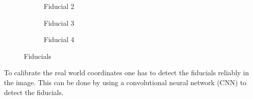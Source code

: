 \begin{figure}[H]
\begin{subfigure}{.2\textwidth}
        \caption[originalRainbow]{Fiducial 2}
        \label{fig:fid_2}
    \end{subfigure}
    \begin{subfigure}{.2\textwidth}
        \centering
        \caption[originalRainbow]{Fiducial 3}
        \label{fig:fid_3}
    \end{subfigure}
    \begin{subfigure}{.2\textwidth}
        \centering
        \caption[originalRainbow]{Fiducial 4}
        \label{fig:fid_4}
    \end{subfigure}
    \caption{Fiducials}
    \label{fig:fiducials_all}
\end{figure}
To calibrate the real world coordinates one has to detect the fiducials reliably in the image.
This can be done by using a convolutional neural network (CNN) to detect the fiducials.

